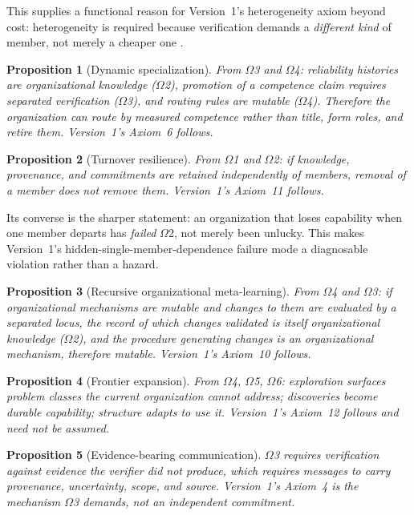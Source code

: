 \documentclass[11pt]{article}
\newtheorem{proposition}{Proposition}
\begin{document}
This supplies a functional reason for Version~1's heterogeneity axiom beyond cost: heterogeneity is required because verification demands a \emph{different kind} of member, not merely a cheaper one \citep{yang2026twoaxisv2}.

\begin{proposition}[Dynamic specialization]
From $\Omega$3 and $\Omega$4: reliability histories are organizational knowledge ($\Omega$2), promotion of a competence claim requires separated verification ($\Omega$3), and routing rules are mutable ($\Omega$4). Therefore the organization can route by measured competence rather than title, form roles, and retire them. Version~1's Axiom~6 follows.
\end{proposition}

\begin{proposition}[Turnover resilience]
From $\Omega$1 and $\Omega$2: if knowledge, provenance, and commitments are retained independently of members, removal of a member does not remove them. Version~1's Axiom~11 follows.
\end{proposition}

Its converse is the sharper statement: an organization that loses capability when one member departs has \emph{failed} $\Omega$2, not merely been unlucky. This makes Version~1's hidden-single-member-dependence failure mode a diagnosable violation rather than a hazard.

\begin{proposition}[Recursive organizational meta-learning]
From $\Omega$4 and $\Omega$3: if organizational mechanisms are mutable and changes to them are evaluated by a separated locus, the record of which changes validated is itself organizational knowledge ($\Omega$2), and the procedure generating changes is an organizational mechanism, therefore mutable. Version~1's Axiom~10 follows.
\end{proposition}

\begin{proposition}[Frontier expansion]\label{prop:frontier}
From $\Omega$4, $\Omega$5, $\Omega$6: exploration surfaces problem classes the current organization cannot address; discoveries become durable capability; structure adapts to use it. Version~1's Axiom~12 follows and need not be assumed.
\end{proposition}

\begin{proposition}[Evidence-bearing communication]
$\Omega$3 requires verification against evidence the verifier did not produce, which requires messages to carry provenance, uncertainty, scope, and source. Version~1's Axiom~4 is the mechanism $\Omega$3 demands, not an independent commitment.
\end{proposition}
\end{document}
